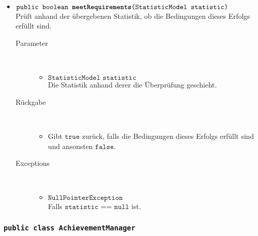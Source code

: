 \begin{description}
\begin{itemize}
		\item $\texttt{public boolean \textbf{meetRequirements}(StatisticModel statistic)}$ \\ Prüft anhand der übergebenen Statistik, ob die Bedingungen dieses Erfolgs erfüllt sind.
		\begin{description}
		\item[Parameter] \hfill \\
			\vspace{-.8cm}
			\begin{itemize}
				\item $\texttt{StatisticModel statistic}$ \\ Die Statistik anhand derer die Überprüfung geschieht. 
			\end{itemize}
			\item[Rückgabe] \hfill \\
			\vspace{-.8cm}
			\begin{itemize}
				\item Gibt $\texttt{true}$ zurück, falls die Bedingungen dieses Erfolgs erfüllt sind und ansonsten $\texttt{false}$.
			\end{itemize}
			\item[Exceptions] \hfill \\
			\vspace{-.8cm}
			\begin{itemize}
				\item $\texttt{NullPointerException}$ \\ Falls $\texttt{statistic == null}$ ist.
			\end{itemize}
		\end{description}
	\end{itemize}
\end{description}

\subsubsection{\normalfont \texttt{public class \textbf{AchievementManager}}}

